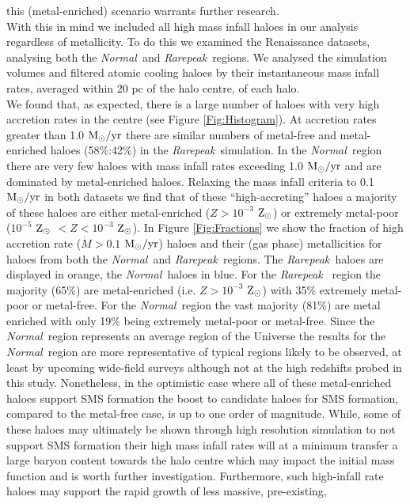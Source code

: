 \documentclass[graphics, twocolumn, usenatbib]{mn2e}
\newcommand{\msolaryr} {$\rm{M_{\odot}/yr}~$}
\newcommand{\msolaryrc} {$\rm{M_{\odot}/yr}$}
\newcommand{\zsolar} {$\rm{Z_{\odot}}~$}
\newcommand{\zsolarc} {$\rm{Z_{\odot}}$}
\newcommand{\rarepeak} {\textit{Rarepeak~}}
\newcommand{\normal} {\textit{Normal~}}
\begin{document}
\citep[e.g.][]{Smith_2015} this (metal-enriched) scenario warrants further research. \\
\indent With this in mind we included all high mass infall haloes in our analysis regardless of
metallicity. To do this we examined the Renaissance datasets, analysing
both the \normal and \rarepeak regions. We analysed the simulation volumes and filtered atomic
cooling haloes by their instantaneous mass infall rates, averaged within 20 pc of the halo centre,
of each halo.  \\
\indent We found that, as expected, there is a large number of haloes with very high accretion rates
in the centre (see Figure \ref{Fig:Histogram}). At accretion rates
greater than 1.0 \msolaryr there are similar numbers of metal-free and metal-enriched haloes
(58\%:42\%) in the \rarepeak simulation. In the \normal region there are very few haloes with mass
infall rates exceeding 1.0 \msolaryr and are dominated by metal-enriched haloes. Relaxing the
mass infall criteria to 0.1 \msolaryr in both datasets we find that of these ``high-accreting''
haloes a majority of these haloes are either metal-enriched ($Z > 10^{-3}$ \zsolarc) or
extremely metal-poor ($10^{-5}$ \zsolar $ < Z < 10^{-3}$ \zsolarc). In Figure \ref{Fig:Fractions}
we show the fraction of high accretion rate ($\dot{M} > 0.1$ \msolaryrc) haloes and
their (gas phase) metallicities for haloes from both the \normal and \rarepeak regions.
The \rarepeak haloes are displayed in orange, the \normal haloes in blue. For the \rarepeak
region the majority (65\%) are metal-enriched (i.e. $Z > 10^{-3}$ \zsolarc) with 35\% extremely
metal-poor or metal-free. For the \normal region the vast
majority (81\%) are metal enriched with only 19\% being extremely metal-poor or metal-free.
Since the \normal region represents an average
region of the Universe the results for the \normal region are more representative of typical
regions likely to be observed, at least by upcoming wide-field surveys although not at the high
redshifts probed in this study. Nonetheless, 
in the optimistic case where all of these metal-enriched haloes support SMS formation the boost to
candidate haloes for SMS formation, compared to the metal-free case, is up to one order of
magnitude. While, some of these haloes may ultimately be shown through high resolution simulation
to not support SMS formation their high mass infall rates will at a minimum transfer a large
baryon content towards the halo centre which may impact the initial mass function and is worth
further investigation. Furthermore, such high-infall rate haloes may support the rapid growth of less massive, pre-existing,
\end{document}
